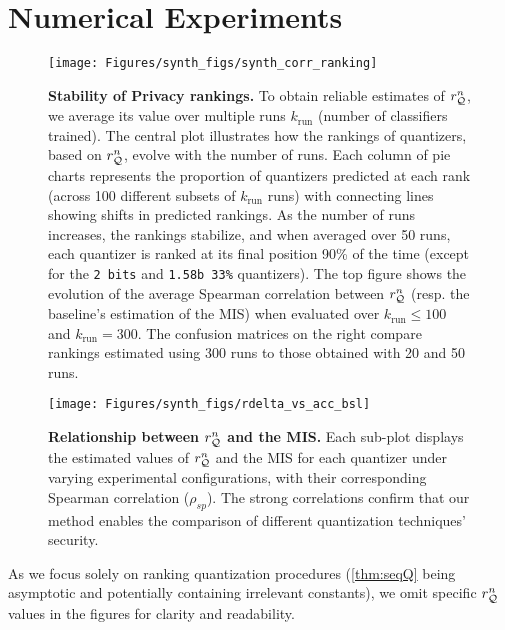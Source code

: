 \section{Numerical Experiments}
\label{sec:num_exp}



\begin{figure*}
    \centering
    \texttt{[image: Figures/synth\_figs/synth\_corr\_ranking]}
    \caption{
    \textbf{Stability of Privacy rankings.}
    To obtain reliable estimates of $r_{{\mathcal{Q}}}^n$, we average its value over multiple runs $k_{\textrm{run}}$ (number of classifiers trained).
    The central plot illustrates how the rankings of quantizers, based on $r_{{\mathcal{Q}}}^n$, evolve with the number of runs.
    Each column of pie charts represents the proportion of quantizers predicted at each rank (across 100 different subsets of $k_{\textrm{run}}$ runs) with connecting lines showing shifts in predicted rankings.
    As the number of runs increases, the rankings stabilize, and when averaged over 50 runs, each quantizer is ranked at its final position 90\% of the time (except for the \texttt{2 bits} and \texttt{1.58b 33\%} quantizers).
    The top figure shows the evolution of the average Spearman correlation between $r_{{\mathcal{Q}}}^n$ (resp. the baseline's estimation of the MIS) when evaluated over $k_{\textrm{run}}\leq 100$ and $k_{\textrm{run}} =300$.
    The confusion matrices on the right compare rankings estimated using 300 runs to those obtained with 20 and 50 runs.
    }
    \label{fig:synth_stability}
\end{figure*}

\label{subsec:synthetic_expe}
\begin{figure}
    \centering
    \texttt{[image: Figures/synth\_figs/rdelta\_vs\_acc\_bsl]}
    \caption{
        \textbf{Relationship between $r_{{\mathcal{Q}}}^n$ and the MIS.}
         Each sub-plot displays the estimated values of $r_{{\mathcal{Q}}}^n$ and the MIS for each quantizer under varying experimental configurations, with their corresponding Spearman correlation ($\rho_{sp}$).
        The strong correlations confirm that our method enables the comparison of different quantization techniques' security.
    }
    \label{fig:scatterplot_synth}
\end{figure}
As we focus solely on ranking quantization procedures (\autoref{thm:seqQ} being asymptotic and potentially containing irrelevant constants), we omit specific 
$r_{{\mathcal{Q}}}^n$ values in the figures for clarity and readability.

